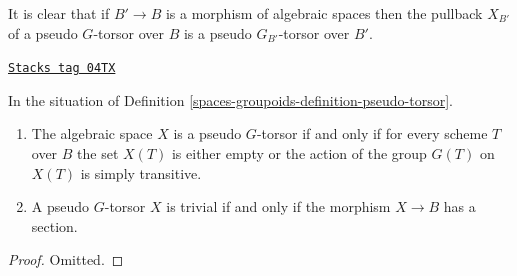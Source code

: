 It is clear that if $B' \to B$ is a morphism of algebraic spaces then
the pullback $X_{B'}$ of a pseudo $G$-torsor over $B$ is a
pseudo $G_{B'}$-torsor over $B'$.

\begin{lemma}
\label{spaces-groupoids-lemma-characterize-trivial-pseudo-torsors}
\href{https://stacks.math.columbia.edu/tag/04TX}{\texttt{Stacks tag 04TX}}

In the situation of
Definition \ref{spaces-groupoids-definition-pseudo-torsor}.
\begin{enumerate}
\item The algebraic space $X$ is a pseudo $G$-torsor if and only if for
every scheme $T$ over $B$ the set $X(T)$ is either empty or the action
of the group $G(T)$ on $X(T)$ is simply transitive.
\item A pseudo $G$-torsor $X$ is trivial if and only if the morphism
$X \to B$ has a section.
\end{enumerate}
\end{lemma}

\begin{proof}
Omitted.
\end{proof}

